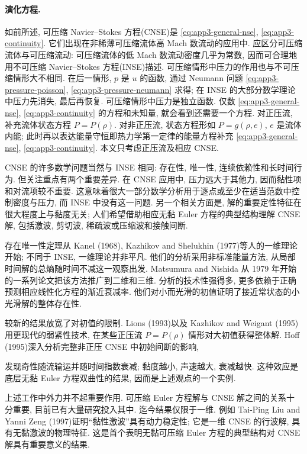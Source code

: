 \paragraph{演化方程.}
如前所述, 可压缩 Navier--Stokes 方程(CNSE)是 
\eqref{eq:app3-general-nse}, 
\eqref{eq:app3-continuity}. 它们出现在非稀薄可压缩流体高 Mach 数流动的应用中. 应区分可压缩流体与可压缩流动: 可压缩流体的低 Mach 数流动密度几乎为常数, 因而可合理地用不可压缩 Navier--Stokes 方程(INSE)描述. 可压缩情形中压力的作用也与不可压缩情形大不相同. 在后一情形, $p$ 是 $u$ 的函数, 通过 Neumann 问题 
\eqref{eq:app3-pressure-poisson}, 
\eqref{eq:app3-pressure-neumann} 求得; 在 INSE 的大部分数学理论中压力先消失, 最后再恢复. 可压缩情形中压力是独立函数. 仅数 
\eqref{eq:app3-general-nse}, 
\eqref{eq:app3-continuity} 的方程和未知量, 就会看到还需要一个方程. 对正压流, 补充流体状态方程 $P=P(\rho)$. 对非正压流, 状态方程形如 $P=g(\rho,e)$, $e$ 是流体内能; 此时再以表达能量守恒即热力学第一定律的能量方程补充 
\eqref{eq:app3-general-nse}, 
\eqref{eq:app3-continuity}. 本文只考虑正压流及相应 CNSE.

CNSE 的许多数学问题当然与 INSE 相同: 存在性, 唯一性, 连续依赖性和长时间行为. 但关注重点有两个重要差异. 在 CNSE 应用中, 压力远大于其他力, 因而黏性项和对流项较不重要. 这意味着很大一部分数学分析用于逐点或至少在适当范数中控制密度与压力, 而 INSE 中没有这一问题. 另一个相关方面是, 解的重要定性特征在很大程度上与黏度无关; 人们希望借助相应无黏 Euler 方程的典型结构理解 CNSE 解, 包括激波, 剪切波, 稀疏波或压缩波和接触间断.

存在唯一性定理从 Kanel (1968), Kazhikov and Shelukhin (1977)等人的一维理论开始; 不同于 INSE, 一维理论并非平凡. 他们的分析采用非标准能量方法, 从局部时间解的总熵随时间不减这一观察出发. Matsumura and Nishida 从 1979 年开始的一系列论文把该方法推广到二维和三维. 分析的技术性强得多, 更多依赖于正确预测相应线性化方程的渐近衰减率. 他们对小而光滑的初值证明了接近常状态的小光滑解的整体存在性.

较新的结果放宽了对初值的限制. Lions (1993)以及 Kazhikov and Weigant (1995)用更现代的弱紧性技术, 在某些正压流 $P=P(\rho)$ 情形对大初值获得整体解. Hoff (1995)深入分析完整非正压 CNSE 中初始间断的影响,

\hypertarget{appendix-03-page-369}{}
发现奇性随流输运并随时间指数衰减; 黏度越小, 声速越大, 衰减越快. 这种效应是底层无黏 Euler 方程双曲性的结果, 因而是上述观点的一个实例.

上述工作中外力并不起重要作用. 可压缩 Euler 方程解与 CNSE 解之间的关系十分重要, 目前已有大量研究投入其中. 迄今结果仅限于一维. 例如 Tai-Ping Liu and Yanni Zeng (1997)证明``黏性激波''具有动力稳定性; 它是一维 CNSE 的行波解, 具有无黏激波的物理特征. 这是首个表明无黏可压缩 Euler 方程的典型结构对 CNSE 解具有重要意义的结果.

